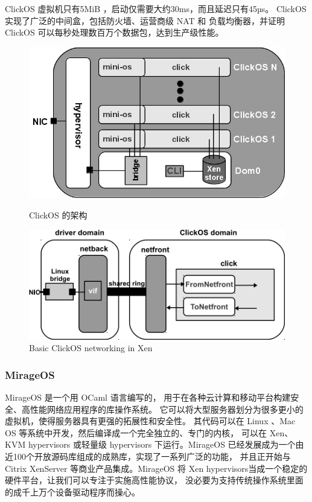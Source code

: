\documentclass{../runikraft-report}
\begin{document}
ClickOS 虚拟机只有5MiB ，启动仅需要大约30ms，而且延迟只有45µs。
ClickOS 实现了广泛的中间盒，包括防火墙、运营商级 NAT 和
负载均衡器，并证明 ClickOS 可以每秒处理数百万个数据包，达到生产级性能。\cite{bib:12-clickos}\cite{bib:13-clickos2}

\begin{figure}[!hbt]
\begin{minipage}{0.49\linewidth}
\includegraphics[width=\linewidth]{pictures/clickOS_arch.jpg}
\caption{ClickOS 的架构\cite{bib:13-clickos2}}
\end{minipage}
\begin{minipage}{0.49\linewidth}
\includegraphics[width=\linewidth]{pictures/ClickOS_networking.png}
\caption{Basic ClickOS networking in Xen\cite{bib:12-clickos}}
\end{minipage}
\end{figure}

\subsubsection{MirageOS}

MirageOS 是一个用 OCaml 语言编写的，
用于在各种云计算和移动平台构建安全、高性能网络应用程序的库操作系统。
它可以将大型服务器划分为很多更小的虚拟机，使得服务器具有更强的拓展性和安全性。
其代码可以在 Linux 、Mac OS 等系统中开发，然后编译成一个完全独立的、专门的内核，
可以在 Xen、KVM hypervisors 或轻量级 hypervisors 下运行。MirageOS
已经发展成为一个由近100个开放源码库组成的成熟库，实现了一系列广泛的功能，
并且正开始与 Citrix XenServer 等商业产品集成。MirageOS
将 Xen hypervisors当成一个稳定的硬件平台，让我们可以专注于实施高性能协议，
没必要为支持传统操作系统里面的成千上万个设备驱动程序而操心。\cite{bib:11-unikerel2}
\end{document}
